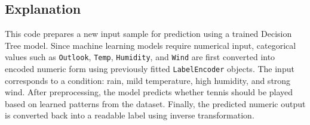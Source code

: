 \documentclass[11pt]{article}
\begin{document}
\subsection*{Explanation}
This code prepares a new input sample for prediction using a trained Decision Tree model. Since machine learning models require numerical input, categorical values such as \texttt{Outlook}, \texttt{Temp}, \texttt{Humidity}, and \texttt{Wind} are first converted into encoded numeric form using previously fitted \texttt{LabelEncoder} objects. The input corresponds to a condition: rain, mild temperature, high humidity, and strong wind. After preprocessing, the model predicts whether tennis should be played based on learned patterns from the dataset. Finally, the predicted numeric output is converted back into a readable label using inverse transformation.
\end{document}
